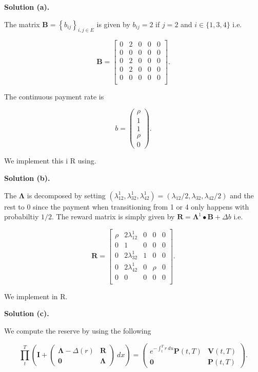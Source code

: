 \documentclass[a4paper,12pt,openany]{book}
\begin{document}
\textbf{Solution (a).}

The matrix \(\mathbf B=\left\{b_{ij}\right\}_{i,j\in E}\) is given by \(b_{ij}=2\) if \(j=2\) and \(i\in \{1,3,4\}\) i.e.

\[
\mathbf B=
\begin{bmatrix}
0 & 2 &0 &0 & 0 \\
0 & 0 &0 &0 & 0 \\
0 & 2 &0 &0 & 0 \\
0 & 2 &0 &0 & 0 \\
0 & 0 &0 &0 & 0 \\
\end{bmatrix}.
\]

The continuous payment rate is

\[
b=\begin{pmatrix}
\rho\\
1\\
1\\
\rho\\
0
\end{pmatrix}.
\]

We implement this i R using.

\textbf{Solution (b).}

The \(\mathbf \Lambda\) is decomposed by setting \((\lambda^1_{12},\lambda^1_{32},\lambda^1_{42})=(\lambda_{12}/2,\lambda_{32},\lambda_{42}/2)\) and the rest to 0 since the payment when transitioning from 1 or 4 only happens with probabiltiy \(1/2\). The reward matrix is simply given by \(\mathbf R=\mathbf \Lambda^1 \bullet \mathbf B + \Delta b\) i.e.

\[
\mathbf R = 
\begin{bmatrix}
\rho & 2\lambda_{12}^1 &0 &0 & 0 \\
0 & 1 &0 &0 & 0 \\
0 & 2\lambda_{32}^1 &1 &0 & 0 \\
0 & 2\lambda_{42}^1 &0 &\rho & 0 \\
0 & 0 &0 &0 & 0 \\
\end{bmatrix}.
\]

We implement in R.

\textbf{Solution (c).}

We compute the reserve by using the following

\[
\prod_t^T\left(\mathbf I+\begin{pmatrix}
\mathbf \Lambda-\Delta(r) & \mathbf R\\
\mathbf 0 & \mathbf \Lambda
\end{pmatrix}\ dx\right)=
\begin{pmatrix}
e^{-\int_t^Tr\ du}\mathbf P(t,T) & \mathbf V(t,T)\\
\mathbf 0 & \mathbf P(t,T)
\end{pmatrix}.
\]
\end{document}
